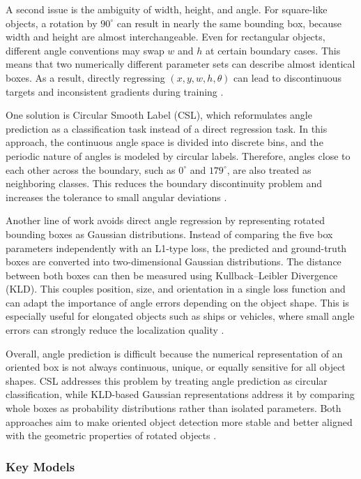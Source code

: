 A second issue is the ambiguity of width, height, and angle. For square-like objects, a rotation by $90^\circ$ can result in nearly the same bounding box, because width and height are almost interchangeable. Even for rectangular objects, different angle conventions may swap $w$ and $h$ at certain boundary cases. This means that two numerically different parameter sets can describe almost identical boxes. As a result, directly regressing $(x, y, w, h, \theta)$ can lead to discontinuous targets and inconsistent gradients during training \cite{yang2022arbitrary}.

One solution is Circular Smooth Label (CSL), which reformulates angle prediction as a classification task instead of a direct regression task. In this approach, the continuous angle space is divided into discrete bins, and the periodic nature of angles is modeled by circular labels. Therefore, angles close to each other across the boundary, such as $0^\circ$ and $179^\circ$, are also treated as neighboring classes. This reduces the boundary discontinuity problem and increases the tolerance to small angular deviations \cite{yang2022arbitrary}.

Another line of work avoids direct angle regression by representing rotated bounding boxes as Gaussian distributions. Instead of comparing the five box parameters independently with an L1-type loss, the predicted and ground-truth boxes are converted into two-dimensional Gaussian distributions. The distance between both boxes can then be measured using Kullback--Leibler Divergence (KLD). This couples position, size, and orientation in a single loss function and can adapt the importance of angle errors depending on the object shape. This is especially useful for elongated objects such as ships or vehicles, where small angle errors can strongly reduce the localization quality \cite{yang2021learning}.

Overall, angle prediction is difficult because the numerical representation of an oriented box is not always continuous, unique, or equally sensitive for all object shapes. CSL addresses this problem by treating angle prediction as circular classification, while KLD-based Gaussian representations address it by comparing whole boxes as probability distributions rather than isolated parameters. Both approaches aim to make oriented object detection more stable and better aligned with the geometric properties of rotated objects \cite{yang2022arbitrary,yang2021learning}.


\subsubsection{Key Models}

